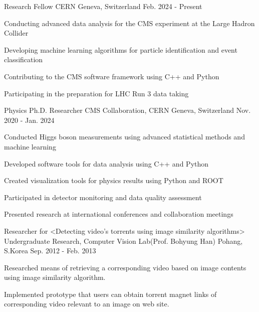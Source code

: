 \begin{cventries}


\cventry
{Research Fellow} %
{CERN} %
{Geneva, Switzerland} %
{Feb. 2024 - Present} %
{ %
\begin{cvitems}
\item {Conducting advanced data analysis for the CMS experiment at the Large Hadron Collider}
\item {Developing machine learning algorithms for particle identification and event classification}
\item {Contributing to the CMS software framework using C++ and Python}
\item {Participating in the preparation for LHC Run 3 data taking}
\end{cvitems}
}


\cventry
{Physics Ph.D. Researcher} %
{CMS Collaboration, CERN} %
{Geneva, Switzerland} %
{Nov. 2020 - Jan. 2024} %
{ %
\begin{cvitems}
\item {Conducted Higgs boson measurements using advanced statistical methods and machine learning}
\item {Developed software tools for data analysis using C++ and Python}
\item {Created visualization tools for physics results using Python and ROOT}
\item {Participated in detector monitoring and data quality assessment}
\item {Presented research at international conferences and collaboration meetings}
\end{cvitems}
}


\cventry
{Researcher for <Detecting video’s torrents using image similarity algorithms>} %
{Undergraduate Research, Computer Vision Lab(Prof. Bohyung Han)} %
{Pohang, S.Korea} %
{Sep. 2012 - Feb. 2013} %
{ %
\begin{cvitems}
\item {Researched means of retrieving a corresponding video based on image contents using image similarity algorithm.}
\item {Implemented prototype that users can obtain torrent magnet links of corresponding video relevant to an image on web site.}
\end{cvitems} 
}


\end{cventries}